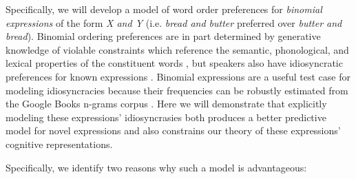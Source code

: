 \documentclass[10pt,letterpaper]{article}
\begin{document}
%

Specifically, we will develop a model of word order preferences for \emph{binomial expressions} of the form \emph{X and Y} (i.e. \emph{bread and butter} preferred over \emph{butter and bread}). Binomial ordering preferences are in part determined by generative knowledge of violable constraints which reference the semantic, phonological, and lexical properties of the constituent words \citep[e.g. short-before-long;][]{Cooper:1975uz,McDonald:1993wq}, but speakers also have idiosyncratic preferences for known expressions \citep{SiyanovaChanturia:2011ep,Morgan:uMm0l0Ja}. Binomial expressions are a useful test case for modeling idiosyncracies because their frequencies can be robustly estimated from the Google Books n-grams corpus \citep{Lin:2012te}. Here we will demonstrate that explicitly modeling these expressions' idiosyncrasies both produces a better predictive model for novel expressions and also constrains our theory of these expressions' cognitive representations.

Specifically, we identify two reasons why such a model is advantageous:
\end{document}
